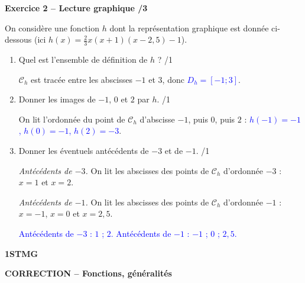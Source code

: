 \documentclass[10pt,a4paper]{article}
\renewcommand{\niveau}{1STMG}
\renewcommand{\chapitre}{Fonctions, généralités}
\renewcommand{\interroversion}[1]{
    \noindent\textbf{\niveau}

    \vspace{-0.5cm}
    \begin{center}
        \textbf{\large CORRECTION -- \chapitre}
    \end{center}

    \vspace{0.1cm}
}
\begin{document}
\textbf{Exercice 2 -- Lecture graphique \hfill /3}

On considère une fonction \(h\) dont la représentation graphique est donnée ci-dessous (ici \(h(x)=\frac{2}{3}x(x+1)(x-2{,}5)-1\)).

\begin{center}
\end{center}

\begin{enumerate}
    \item Quel est l'ensemble de définition de \(h\) ? \hfill /1

    \(\mathcal{C}_h\) est tracée entre les abscisses \(-1\) et \(3\), donc \textcolor{blue}{\(D_h=[-1;3]\)}.
    \item Donner les images de \(-1\), \(0\) et \(2\) par \(h\). \hfill /1

    On lit l'ordonnée du point de \(\mathcal{C}_h\) d'abscisse \(-1\), puis \(0\), puis \(2\) :
    \textcolor{blue}{\(h(-1)=-1\), \(h(0)=-1\), \(h(2)=-3\)}.
    \item Donner les éventuels antécédents de \(-3\) et de \(-1\). \hfill /1

    \emph{Antécédents de \(-3\).} On lit les abscisses des points de \(\mathcal{C}_h\) d'ordonnée \(-3\) : \(x=1\) et \(x=2\).

    \emph{Antécédents de \(-1\).} On lit les abscisses des points de \(\mathcal{C}_h\) d'ordonnée \(-1\) : \(x=-1\), \(x=0\) et \(x=2{,}5\).

    \textcolor{blue}{Antécédents de \(-3\) : \(1\) ; \(2\). Antécédents de \(-1\) : \(-1\) ; \(0\) ; \(2{,}5\).}
\end{enumerate}

\newpage


\interroversion{C}
\end{document}
